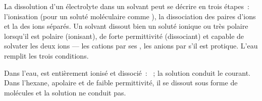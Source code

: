 \begin{proposition}\label{prop:b1:intermolecular-forces-solvents:steps}
La dissolution d'un électrolyte dans un solvant peut se décrire en trois
étapes~: l'ionisation (pour un soluté moléculaire comme ), la
dissociation des paires d'ions et la  des ions séparés. Un
solvant dissout bien un soluté ionique ou très polaire lorsqu'il est
polaire (ionisant), de forte permittivité (dissociant) et capable de
solvater les deux ions --- les cations par ses , les
anions par  s'il est protique. L'eau remplit les trois
conditions.
\end{proposition}

\begin{example}\label{ex:b1:intermolecular-forces-solvents:hcl}
Dans l'eau,  est entièrement ionisé et dissocié~:
~; la solution conduit le
courant. Dans l'hexane, apolaire et de faible permittivité, il se
dissout sous forme de molécules  et la solution ne conduit pas.
\end{example}

